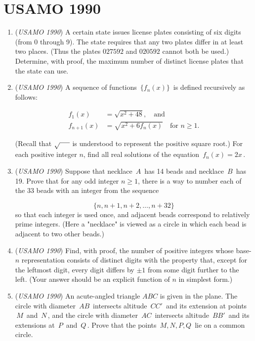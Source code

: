 \section{USAMO 1990}
        \begin{enumerate}
        	\item (\textit{USAMO 1990}) A certain state issues license plates consisting of six digits (from 0 through 9). The state requires that any two plates differ in at least two places. (Thus the plates $\boxed{027592}$ and $\boxed{020592}$ cannot both be used.) Determine, with proof, the maximum number of distinct license plates that the state can use.


 

	\item (\textit{USAMO 1990}) A sequence of functions $\, \{f_n(x) \} \,$ is defined recursively as follows:

 \begin{align*} f_1(x) &= \sqrt {x^2 + 48}, \quad \text{and} \\ f_{n + 1}(x) &= \sqrt {x^2 + 6f_n(x)} \quad \text{for } n \geq 1. \end{align*}

(Recall that $\sqrt {\makebox[5mm]{}}$ is understood to represent the positive square root.) For each positive integer $n$, find all real solutions of the equation $\, f_n(x) = 2x \,$.


 

	\item (\textit{USAMO 1990}) Suppose that necklace $\, A \,$ has 14 beads and necklace $\, B \,$ has 19. Prove that for any odd integer $n \geq 1$, there is a way to number each of the 33 beads with an integer from the sequence

 \[\{ n, n + 1, n + 2, \dots, n + 32 \}\]
so that each integer is used once, and adjacent beads correspond to relatively prime integers. (Here a "necklace" is viewed as a circle in which each bead is adjacent to two other beads.)


 

	\item (\textit{USAMO 1990}) Find, with proof, the number of positive integers whose base-$n$ representation consists of distinct digits with the property that, except for the leftmost digit, every digit differs by $\pm 1$ from some digit further to the left. (Your answer should be an explicit function of $n$ in simplest form.)


 

	\item (\textit{USAMO 1990}) An acute-angled triangle $ABC$ is given in the plane. The circle with diameter $\, AB \,$ intersects altitude $\, CC' \,$ and its extension at points $\, M \,$ and $\, N \,$, and the circle with diameter $\, AC \,$ intersects altitude $\, BB' \,$ and its extensions at $\, P \,$ and $\, Q \,$. Prove that the points $\, M, N, P, Q \,$ lie on a common circle.


 

\end{enumerate}